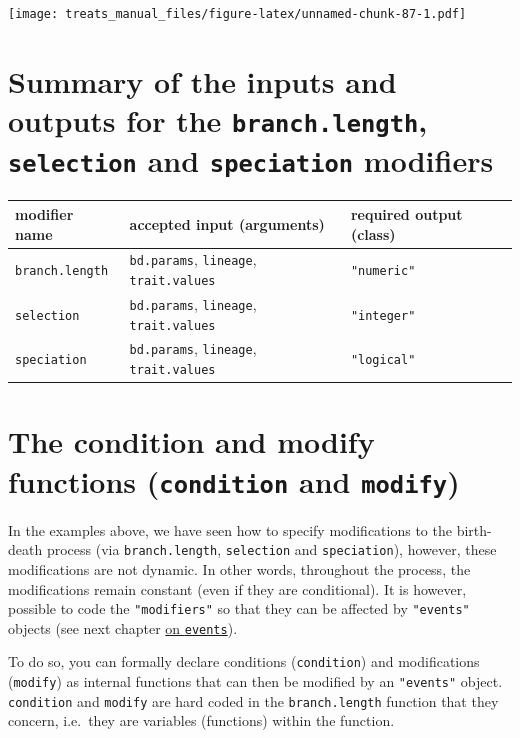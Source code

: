 \documentclass[
]{book}
\begin{document}
\texttt{[image: treats\_manual\_files/figure-latex/unnamed-chunk-87-1.pdf]}

\hypertarget{summarymodifiers}{%
\section{\texorpdfstring{Summary of the inputs and outputs for the \texttt{branch.length}, \texttt{selection} and \texttt{speciation} modifiers}{Summary of the inputs and outputs for the branch.length, selection and speciation modifiers}}\label{summarymodifiers}}

\begin{longtable}[]{@{}lll@{}}
\toprule
modifier name & accepted input (arguments) & required output (class)\tabularnewline
\midrule
\endhead
\texttt{branch.length} & \texttt{bd.params}, \texttt{lineage}, \texttt{trait.values} & \texttt{"numeric"}\tabularnewline
\texttt{selection} & \texttt{bd.params}, \texttt{lineage}, \texttt{trait.values} & \texttt{"integer"}\tabularnewline
\texttt{speciation} & \texttt{bd.params}, \texttt{lineage}, \texttt{trait.values} & \texttt{"logical"}\tabularnewline
\bottomrule
\end{longtable}

\hypertarget{the-condition-and-modify-functions-condition-and-modify}{%
\section{\texorpdfstring{The condition and modify functions (\texttt{condition} and \texttt{modify})}{The condition and modify functions (condition and modify)}}\label{the-condition-and-modify-functions-condition-and-modify}}

In the examples above, we have seen how to specify modifications to the birth-death process (via \texttt{branch.length}, \texttt{selection} and \texttt{speciation}), however, these modifications are not dynamic.
In other words, throughout the process, the modifications remain constant (even if they are conditional).
It is however, possible to code the \texttt{"modifiers"} so that they can be affected by \texttt{"events"} objects (see next chapter \protect\hyperlink{makeevents}{on \texttt{events}}).

To do so, you can formally declare conditions (\texttt{condition}) and modifications (\texttt{modify}) as internal functions that can then be modified by an \texttt{"events"} object.
\texttt{condition} and \texttt{modify} are hard coded in the \texttt{branch.length} function that they concern, i.e.~they are variables (functions) within the function.
\end{document}
